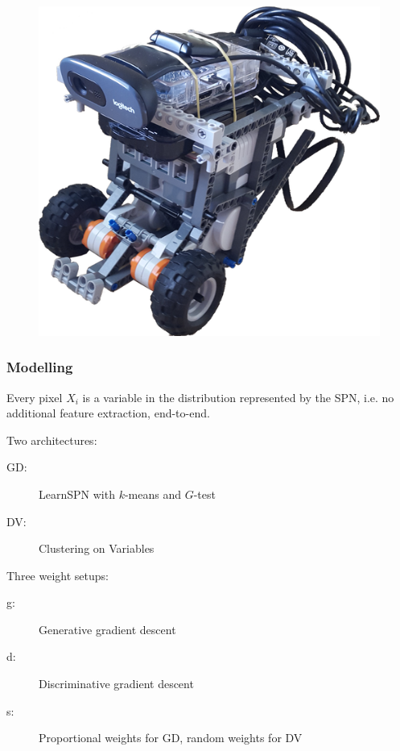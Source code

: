 \documentclass{beamer}
\begin{document}
\begin{frame}
\begin{figure}
\begin{minipage}{0.3\textwidth}
      \includegraphics[width=\linewidth]{imgs/robot.png}
    \end{minipage}
  \end{figure}
\end{frame}

\begin{frame}
  \frametitle{Modelling}

  Every pixel $X_i$ is a variable in the distribution represented by the SPN, i.e. no additional
  feature extraction, end-to-end.

  Two architectures:
  \begin{description}
    \item[GD:] LearnSPN with $k$-means and $G$-test
    \item[DV:] Clustering on Variables
  \end{description}
  Three weight setups:
  \begin{description}
    \item[g:] Generative gradient descent
    \item[d:] Discriminative gradient descent
    \item[s:] Proportional weights for GD, random weights for DV
  \end{description}
\end{frame}
\end{document}
